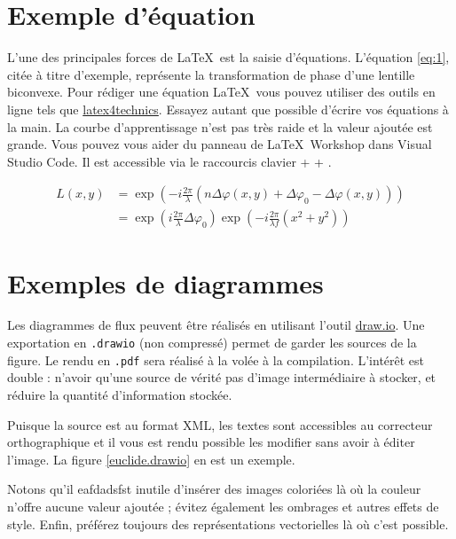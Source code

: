 \section{Exemple d'équation}
L'une des principales forces de \LaTeX~est la saisie d'équations. L'équation \ref{eq:1}, citée à titre d'exemple, représente la transformation de phase d'une lentille biconvexe. Pour rédiger une équation \LaTeX~vous pouvez utiliser des outils en ligne tels que \href{https://www.latex4technics.com/}{latex4technics}. Essayez autant que possible d'écrire vos équations à la main. La courbe d'apprentissage n'est pas très raide et la valeur ajoutée est grande. Vous pouvez vous aider du panneau de \LaTeX~Workshop dans Visual Studio Code. Il est accessible via le raccourcis clavier  +  + .

\begin{equation} \label{eq:1}
    \begin{split}
        L(x,y) &= \exp\left( - i\frac{{2\pi }}{\lambda }\left( {n\Delta \varphi (x,y) + \Delta {\varphi _0} - \Delta \varphi (x,y)} \right)\right)\\
        &= {\exp\left({i\frac{{2\pi }}{\lambda }\Delta {\varphi _0}}\right)}{\exp\left({ - i\frac{{2\pi }}{{\lambda f}}({x^2} + {y^2})}\right)}
    \end{split}
\end{equation}

\section{Exemples de diagrammes}

Les diagrammes de flux peuvent être réalisés en utilisant l'outil \href{https://app.diagrams.net/}{draw.io}. Une exportation en \texttt{.drawio} (non compressé) permet de garder les sources de la figure. Le rendu en \texttt{.pdf} sera réalisé à la volée à la compilation. L'intérêt est double : n'avoir qu'une source de vérité \cad pas d'image intermédiaire à stocker, et réduire la quantité d'information stockée.

Puisque la source est au format XML, les textes sont accessibles au correcteur orthographique et il vous est rendu possible les modifier sans avoir à éditer l'image. La figure \ref{euclide.drawio} en est un exemple.


Notons qu'il eafdadsfst inutile d'insérer des images coloriées là où la couleur n'offre aucune valeur ajoutée ; évitez également les ombrages et autres effets de style. Enfin, préférez toujours des représentations vectorielles là où c'est possible.

